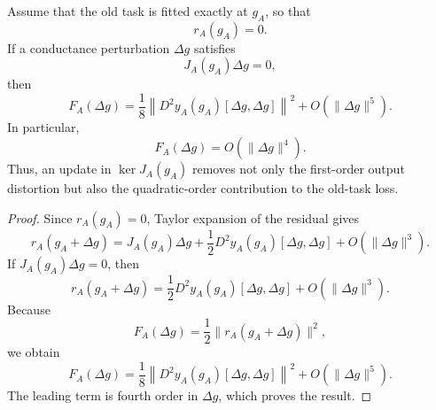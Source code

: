 
\newtheorem{corollary}[theorem]{Corollary}



\begin{theorem}
Assume that the old task is fitted exactly at \(g_A\), so that
\[
    r_A(g_A)=0.
\]
If a conductance perturbation \(\Delta g\) satisfies
\[
    J_A(g_A)\Delta g=0,
\]
then
\[
    F_A(\Delta g)
    =
    \frac{1}{8}
    \left\|
    D^2y_A(g_A)[\Delta g,\Delta g]
    \right\|^2
    +
    O(\|\Delta g\|^5).
\]
In particular,
\[
    \boxed{
    F_A(\Delta g)=O(\|\Delta g\|^4).
    }
\]
Thus, an update in \(\ker J_A(g_A)\) removes not only the first-order
output distortion but also the quadratic-order contribution to the old-task
loss.
\end{theorem}

\begin{proof}
Since \(r_A(g_A)=0\), Taylor expansion of the residual gives
\[
    r_A(g_A+\Delta g)
    =
    J_A(g_A)\Delta g
    +
    \frac{1}{2}D^2y_A(g_A)[\Delta g,\Delta g]
    +
    O(\|\Delta g\|^3).
\]
If \(J_A(g_A)\Delta g=0\), then
\[
    r_A(g_A+\Delta g)
    =
    \frac{1}{2}D^2y_A(g_A)[\Delta g,\Delta g]
    +
    O(\|\Delta g\|^3).
\]
Because
\[
    F_A(\Delta g)
    =
    \frac{1}{2}
    \|r_A(g_A+\Delta g)\|^2,
\]
we obtain
\[
    F_A(\Delta g)
    =
    \frac{1}{8}
    \left\|
    D^2y_A(g_A)[\Delta g,\Delta g]
    \right\|^2
    +
    O(\|\Delta g\|^5).
\]
The leading term is fourth order in \(\Delta g\), which proves the result.
\end{proof}


